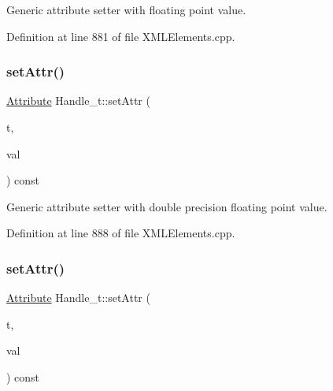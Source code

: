 Generic attribute setter with floating point value. 



Definition at line 881 of file X\+M\+L\+Elements.\+cpp.

\hypertarget{class_d_d4hep_1_1_x_m_l_1_1_handle__t_a8c25de0cc872ede2fa3332ce0a5aa20b}{}\label{class_d_d4hep_1_1_x_m_l_1_1_handle__t_a8c25de0cc872ede2fa3332ce0a5aa20b} 
\subsubsection{\texorpdfstring{set\+Attr()}{setAttr()}\hspace{0.1cm}{\footnotesize\ttfamily [6/8]}}
{\footnotesize\ttfamily \hyperlink{namespace_d_d4hep_1_1_x_m_l_a5c19b7116be99d69b4b22d911357baaf}{Attribute} Handle\+\_\+t\+::set\+Attr (\begin{DoxyParamCaption}\item[{const \hyperlink{namespace_d_d4hep_1_1_x_m_l_a09e5d9cc86ed782f6826dfe0778c1815}{Xml\+Char} $\ast$}]{t,  }\item[{double}]{val }\end{DoxyParamCaption}) const}



Generic attribute setter with double precision floating point value. 



Definition at line 888 of file X\+M\+L\+Elements.\+cpp.

\hypertarget{class_d_d4hep_1_1_x_m_l_1_1_handle__t_a6b79123e1e42a75a6e258c8e296ffd18}{}\label{class_d_d4hep_1_1_x_m_l_1_1_handle__t_a6b79123e1e42a75a6e258c8e296ffd18} 
\subsubsection{\texorpdfstring{set\+Attr()}{setAttr()}\hspace{0.1cm}{\footnotesize\ttfamily [7/8]}}
{\footnotesize\ttfamily \hyperlink{namespace_d_d4hep_1_1_x_m_l_a5c19b7116be99d69b4b22d911357baaf}{Attribute} Handle\+\_\+t\+::set\+Attr (\begin{DoxyParamCaption}\item[{const \hyperlink{namespace_d_d4hep_1_1_x_m_l_a09e5d9cc86ed782f6826dfe0778c1815}{Xml\+Char} $\ast$}]{t,  }\item[{const std\+::string \&}]{val }\end{DoxyParamCaption}) const}



